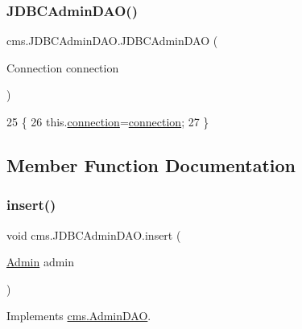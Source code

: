 \subsubsection{\texorpdfstring{J\+D\+B\+C\+Admin\+D\+A\+O()}{JDBCAdminDAO()}}
{\footnotesize\ttfamily cms.\+J\+D\+B\+C\+Admin\+D\+A\+O.\+J\+D\+B\+C\+Admin\+D\+AO (\begin{DoxyParamCaption}\item[{Connection}]{connection }\end{DoxyParamCaption})\hspace{0.3cm}{\ttfamily [inline]}}


\begin{DoxyCode}
25                                            \{
26      this.\mbox{\hyperlink{classcms_1_1_j_d_b_c_admin_d_a_o_a970f1be51071c85c0b1e55b45f21bcad}{connection}}=\mbox{\hyperlink{classcms_1_1_j_d_b_c_admin_d_a_o_a970f1be51071c85c0b1e55b45f21bcad}{connection}};
27  \}
\end{DoxyCode}


\subsection{Member Function Documentation}
\mbox{\label{classcms_1_1_j_d_b_c_admin_d_a_o_a63cbff25e5bc997e5976e37d2b809270}} 
\subsubsection{\texorpdfstring{insert()}{insert()}}
{\footnotesize\ttfamily void cms.\+J\+D\+B\+C\+Admin\+D\+A\+O.\+insert (\begin{DoxyParamCaption}\item[{\mbox{\hyperlink{classcms_1_1_admin}{Admin}}}]{admin }\end{DoxyParamCaption})\hspace{0.3cm}{\ttfamily [inline]}}



Implements \mbox{\hyperlink{interfacecms_1_1_admin_d_a_o_ae4de78db63d901e5855f242d5ae06869}{cms.\+Admin\+D\+AO}}.


